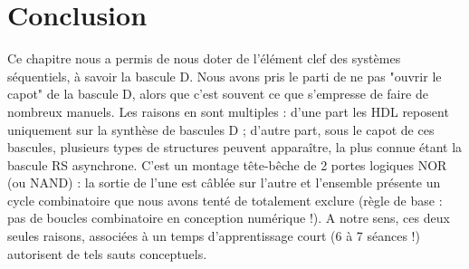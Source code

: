 \section{Conclusion}
Ce chapitre nous a permis de nous doter de l'élément clef des systèmes séquentiels, à savoir la bascule D. Nous avons pris le parti de ne pas "ouvrir le capot" de la bascule D, alors
que c'est souvent ce que s'empresse de faire de nombreux manuels. Les raisons en sont multiples : d'une part les HDL reposent uniquement sur la synthèse de bascules D ; d'autre part, sous le capot
de ces bascules, plusieurs types de structures peuvent apparaître, la plus connue étant la bascule RS asynchrone. C'est un montage tête-bêche de 2 portes logiques NOR (ou NAND) : la sortie de l'une est câblée sur l'autre et l'ensemble
présente un cycle combinatoire que nous avons tenté de totalement exclure (règle de base : pas de boucles combinatoire en conception numérique !). A notre sens, ces deux seules raisons, associées à un temps d'apprentissage court (6 à 7 séances !)
autorisent de tels sauts conceptuels.
